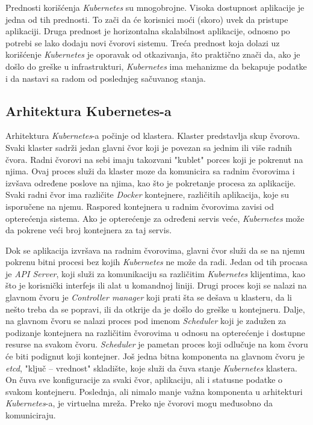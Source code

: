 Prednosti korišćenja \textit{Kubernetes} su mnogobrojne. Visoka dostupnost aplikacije je jedna od tih prednosti. 
To zači da će korisnici moći (skoro) uvek da pristupe aplikaciji. Druga prednost je horizontalna 
skalabilnost aplikacije, odnosno po potrebi se lako dodaju novi čvorovi sistemu. Treća prednost koja 
dolazi uz korišćenje \textit{Kubernetes} je oporavak od otkazivanja, što praktično znači da, ako je došlo do 
greške u infrastrukturi, \textit{Kubernetes} ima mehanizme da bekapuje podatke i da nastavi sa radom od 
poslednjeg sačuvanog stanja.

\subsection{Arhitektura Kubernetes-a}
Arhitektura \textit{Kubernetes}-a počinje od klastera. Klaster predstavlja skup čvorova. Svaki klaster sadrži
jedan glavni čvor koji je povezan sa jednim ili više radnih čvora. Radni čvorovi na sebi imaju 
takozvani "kublet" porces koji je pokrenut na njima. Ovaj proces služi da klaster moze da komunicira
sa radnim čvorovima i izvšava određene poslove na njima, kao što je pokretanje procesa za aplikacije.
Svaki radni čvor ima različite \textit{Docker} kontejnere, različitih aplikacija, koje su isporučene na njemu.
Raspored kontejnera u radnim čvorovima zavisi od opterećenja sistema. Ako je opterećenje za određeni 
servis veće, \textit{Kubernetes} može da pokrene veći broj kontejnera za taj servis. 

Dok se aplikacija izvršava na radnim čvorovima, glavni čvor služi da se na njemu pokrenu bitni procesi 
bez kojih \textit{Kubernetes} ne može da radi. Jedan od tih procasa je {\em API Server}, koji služi za 
komunikaciju sa različitim \textit{Kubernetes} klijentima, kao što je korisnički interfejs ili alat u 
komandnoj liniji. Drugi proces koji se nalazi na glavnom čvoru je {\em Controller manager} koji 
prati šta se dešava u klasteru, da li nešto treba da se popravi, ili da otkrije da je došlo do greške 
u kontejneru. Dalje, na glavnom čvoru se nalazi proces pod imenom {\em Scheduler} koji je zadužen 
za podizanje kontejnera na različitim čvorovima u odnosu na opterećenje i dostupne resurse na svakom 
čvoru. \textit{Scheduler} je pametan proces koji odlučuje na kom čvoru će biti podignut koji kontejner. 
Još jedna bitna komponenta na glavnom čvoru je {\em etcd}, "ključ -- vrednost" skladište, koje služi 
da čuva stanje \textit{Kubernetes} klastera. On čuva sve konfiguracije za svaki čvor, aplikaciju, ali i statusne 
podatke o svakom kontejneru. Poslednja, ali nimalo manje važna komponenta u arhitekturi \textit{Kubernetes}-a, 
je virtuelna mreža. Preko nje čvorovi mogu međusobno da komuniciraju. 

